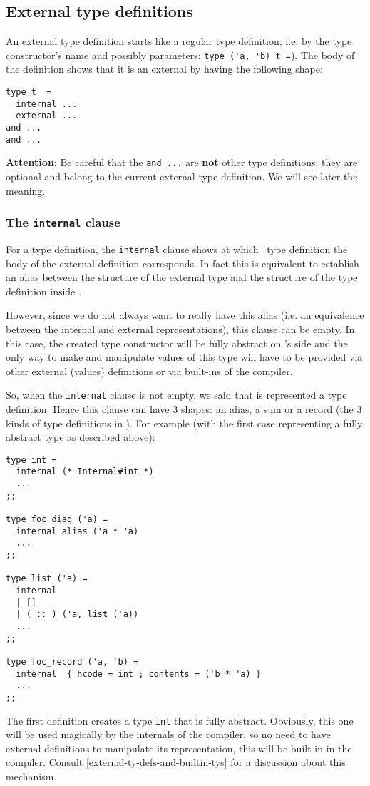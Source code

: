 \subsection{External type definitions}
\label{external-type-def-codegen-model}
An external type definition starts like a regular type definition,
i.e. by the type constructor's name and possibly parameters:
\lstinline!type ('a, 'b) t =!). The body of the definition shows that
it is an external by having the following shape:

{\footnotesize
\begin{lstlisting}
type t  =
  internal ...
  external ...
and ...
and ...
\end{lstlisting}
}

{\bf Attention}: Be careful that the {\tt and ...} are {\bf not} other
type definitions: they are optional and belong to the current external
type definition. We will see later the meaning.

\subsubsection{The {\tt internal} clause}
For a type definition, the {\tt internal} clause shows at which
\focalize\ type definition the body of the external definition
corresponds. In fact this is equivalent to establish an alias between
the structure of the external type and the structure of the type
definition inside \focalize.

However, since we do not always want to really have this alias
(i.e. an equivalence between the internal and external
representations), this clause can be empty. In this case, the created
type constructor will be fully abstract on \focalize's side and the
only way to make and manipulate values of this type will have to be
provided via other external (values) definitions or via built-ins of
the compiler.

\medskip
So, when the {\tt internal} clause is not empty, we said that is
represented a type definition. Hence this clause can have 3 shapes: an
alias, a sum or a record (the 3 kinds of type definitions in
\focalize). For example (with the first case representing a fully
abstract type as described above):

{\footnotesize
\begin{lstlisting}[title=External type definitions]
type int =
  internal (* Internal#int *)
  ...
;;

type foc_diag ('a) =
  internal alias ('a * 'a)
  ...
;;

type list ('a) =
  internal
  | []
  | ( :: ) ('a, list ('a))
  ...
;;

type foc_record ('a, 'b) =
  internal  { hcode = int ; contents = ('b * 'a) }
  ...
;;
\end{lstlisting}
}
The first definition creates a type {\tt int} that is fully
abstract. Obviously, this one will be used magically by the internals
of the compiler, so no need to have external definitions to manipulate
its representation, this will be built-in in the compiler. Consult
\ref{external-ty-defs-and-builtin-tys} for a discussion about this
mechanism.

